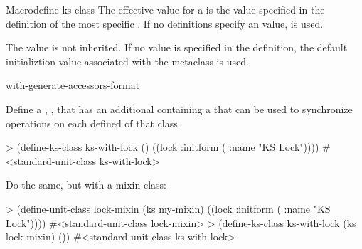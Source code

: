 \documentclass[10pt,twoside,english,pdftex]{article}
\begin{document}
\begin{functiondoc}{Macro}{define-ks-class}
The effective  value for a
 is the value specified in the definition of the
most specific . If no definitions specify an
 value, \nil{} is used.

The  value is not inherited.  If
no value is specified in the  definition, the
default initializtion value associated with the metaclass is used.

\begin{alsos}{with-generate-accessors-format}
\also[define-ks]
\end{alsos}

\fnexamples
Define a ,
, that has an additional 
containing a  that can be used to synchronize
operations on each defined  of that class.
\begin{example}
> (define-ks-class ks-with-lock ()
    ((lock :initform ( :name "KS Lock"))))
#<standard-unit-class ks-with-lock>
\end{example}

Do the same, but with a mixin class:
\begin{example}
> (define-unit-class lock-mixin (ks my-mixin)
    ((lock :initform ( :name "KS Lock"))))
#<standard-unit-class lock-mixin>
> (define-ks-class ks-with-lock (ks lock-mixin)
    ())
#<standard-unit-class ks-with-lock>
\end{example}

\end{functiondoc}

\end{document}
